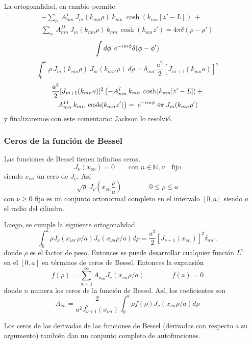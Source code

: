 \documentclass[10pt,oneside]{CBFT_book}
\begin{document}
La ortogonalidad, en cambio permite
\begin{multline*}
	- \sum_{n} \: A_{mn}^I \: J_m(k_{mn}\rho) 
	\: k_{mn} \: \cosh( k_{mn}[z'-L]) \: + \\
	\sum_{n} \: A_{mn}^{II} \: J_m(k_{mn}\rho) \: k_{mn} \: \cosh( k_{mn}z')
	= 4 \pi \delta(\rho-\rho')
\end{multline*}
\[
	\int d\phi \: \:\mathrm{e}^{- i m \phi } \delta(\phi-\phi')
\]
\[
	\int_0^a \rho \: J_m(k_{mn}\rho) \: J_m(k_{mn'}\rho) \: d\rho = 
	\delta_{mn'} \frac{a^2}{2} [ J_{m+1}(k_{mn}a) ]^2
\]
\begin{multline*}
	\frac{a^2}{2} [ J_{m+1}(k_{mn}a) ]^2 
	\left( -A_{mn}^I \: k_{mn} \: \cosh( k_{mn}[z'-L]) \: + \right.\\
	\left. A_{mn}^{II} \: k_{mn} \: \cosh( k_{mn}z') \right) 
	= \:\mathrm{e}^{-i m \phi } \: 4 \pi \: J_m( k_{mn} \rho')
\end{multline*}
y finalizaremos con este comentario: Jackson lo resolvió.

\subsubsection{Ceros de la función de Bessel}

Las funciones de Bessel tienen infinitos ceros,
\[
	J_\nu(x_{\nu n}) = 0 \qquad \mathrm{con} \; n\in\mathbb{N}, \nu \quad \mathrm{fijo} 
\]
siendo $x_{\nu n}$ un cero de $J_\nu$. Así
\[
	\sqrt{\rho} \: J_\nu\left( x_{\nu n} \frac \rho a \right) \qquad\qquad 0 \leq \rho \leq a
\]
con $\nu \geq 0$ fijo es un conjunto ortonormal completo en el intervalo $[0,a]$ siendo $a$ 
el radio del cilindro.

Luego, se cumple la siguiente ortogonalidad
\[
	\int_0^a \rho  J_\nu (x_{\nu n'} \rho/a)  J_\nu (x_{\nu n} \rho/a)  d\rho = 
	\frac{a^2}{2}[J_{\nu+1}(x_{\nu n})]^2 \delta_{nn'}.
\]
donde $\rho$ es el factor de peso. Entonces se puede desarrollar cualquier función $L^2$ en el $[0,a]$
en términos de ceros de Bessel.
Entonces la expansión
\[
	f(\rho) = \sum_{n=1}^{\infty}  A_{x_{\nu n}} J_{\nu}( x_{\nu n} \rho/a ) \qquad \qquad 
	f(a) = 0
\]
donde $n$ numera los ceros de la función de Bessel.
Así, los coeficientes son
\[
	A_{\nu n} = \frac{2}{a^2 J_{\nu +1}^2 (x_{\nu n})} 
	\int_0^a \rho f(\rho) J_\nu (x_{\nu n} \rho/a) 	d\rho
\]

Los ceros de las derivadas de las funciones de Bessel (derivadas con respecto a su argumento) 
también dan un conjunto completo de autofunciones.
\end{document}
